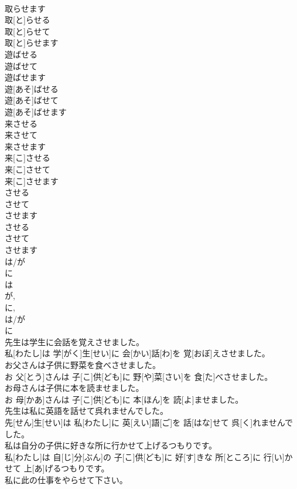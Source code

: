 \documentclass[8pt]{extreport}
\begin{document}
\begin{CJK}{UTF8}{min}
\\	取らせます	
\\	取[と]らせる 
\\	取[と]らせて 
\\	取[と]らせます
\\	遊ばせる 
\\	遊ばせて 
\\	遊ばせます	
\\	遊[あそ]ばせる 
\\	遊[あそ]ばせて 
\\	遊[あそ]ばせます
\\	来させる 
\\	来させて 
\\	来させます	
\\	来[こ]させる 
\\	来[こ]させて 
\\	来[こ]させます
\\	させる 
\\	させて 
\\	させます	
\\	させる 
\\	させて 
\\	させます
\\	は/が 
\\	に 
\\	は 
\\	が, 
\\	に, 
\\	は/が 
\\	に 
\\	先生は学生に会話を覚えさせました。	
\\	私[わたし]は 学[がく]生[せい]に 会[かい]話[わ]を 覚[おぼ]えさせました。
\\	お父さんは子供に野菜を食べさせました。	
\\	お 父[とう]さんは 子[こ]供[ども]に 野[や]菜[さい]を 食[た]べさせました。
\\	お母さんは子供に本を読ませました。	
\\	お 母[かあ]さんは 子[こ]供[ども]に 本[ほん]を 読[よ]ませました。
\\	先生は私に英語を話せて呉れませんでした。	
\\	先[せん]生[せい]は 私[わたし]に 英[えい]語[ご]を 話[はな]せて 呉[く]れませんでした。
\\	私は自分の子供に好きな所に行かせて上げるつもりです。	
\\	私[わたし]は 自[じ]分[ぶん]の 子[こ]供[ども]に 好[す]きな 所[ところ]に 行[い]かせて 上[あ]げるつもりです。
\\	私に此の仕事をやらせて下さい。	

\end{CJK}
\end{document}
